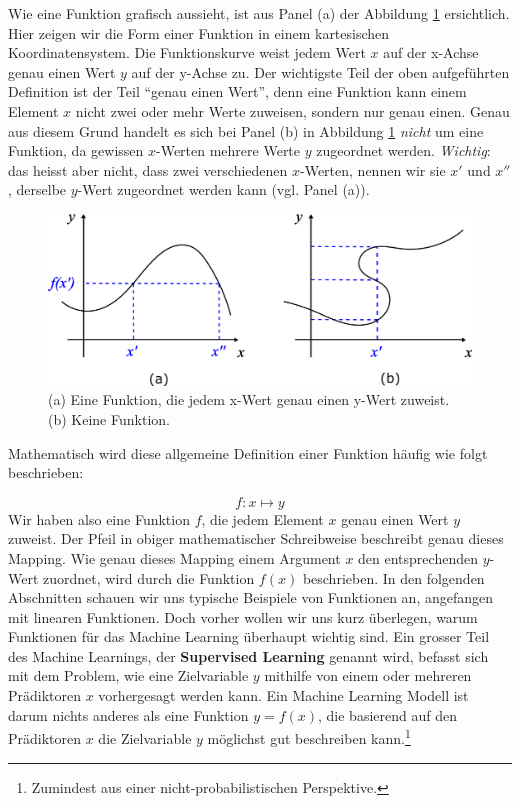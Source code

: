 \documentclass[
]{book}
\begin{document}
Wie eine Funktion grafisch aussieht, ist aus Panel (a) der Abbildung \ref{fig:functions} ersichtlich. Hier zeigen wir die Form einer Funktion in einem kartesischen Koordinatensystem. Die Funktionskurve weist jedem Wert \(x\) auf der x-Achse genau einen Wert \(y\) auf der y-Achse zu. Der wichtigste Teil der oben aufgeführten Definition ist der Teil ``genau einen Wert'', denn eine Funktion kann einem Element \(x\) nicht zwei oder mehr Werte zuweisen, sondern nur genau einen. Genau aus diesem Grund handelt es sich bei Panel (b) in Abbildung \ref{fig:functions} \emph{nicht} um eine Funktion, da gewissen \(x\)-Werten mehrere Werte \(y\) zugeordnet werden. \emph{Wichtig}: das heisst aber nicht, dass zwei verschiedenen \(x\)-Werten, nennen wir sie \(x'\) und \(x''\), derselbe \(y\)-Wert zugeordnet werden kann (vgl. Panel (a)).

\begin{figure}

{\centering \includegraphics[width=0.8\linewidth]{images/Functions} 

}

\caption{(a) Eine Funktion, die jedem x-Wert genau einen y-Wert zuweist. (b) Keine Funktion. }\label{fig:functions}
\end{figure}

Mathematisch wird diese allgemeine Definition einer Funktion häufig wie folgt beschrieben:

\[
f : x \mapsto y
\]
Wir haben also eine Funktion \(f\), die jedem Element \(x\) genau einen Wert \(y\) zuweist. Der Pfeil in obiger mathematischer Schreibweise beschreibt genau dieses Mapping. Wie genau dieses Mapping einem Argument \(x\) den entsprechenden \(y\)-Wert zuordnet, wird durch die Funktion \(f(x)\) beschrieben. In den folgenden Abschnitten schauen wir uns typische Beispiele von Funktionen an, angefangen mit linearen Funktionen. Doch vorher wollen wir uns kurz überlegen, warum Funktionen für das Machine Learning überhaupt wichtig sind. Ein grosser Teil des Machine Learnings, der \textbf{Supervised Learning} genannt wird, befasst sich mit dem Problem, wie eine Zielvariable \(y\) mithilfe von einem oder mehreren Prädiktoren \(x\) vorhergesagt werden kann. Ein Machine Learning Modell ist darum nichts anderes als eine Funktion \(y=f(x)\), die basierend auf den Prädiktoren \(x\) die Zielvariable \(y\) möglichst gut beschreiben kann.\footnote{Zumindest aus einer nicht-probabilistischen Perspektive.}
\end{document}
